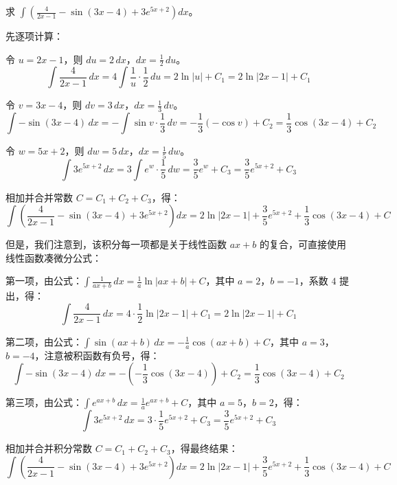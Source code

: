 \begin{myexample}
  求 $\int ( \frac{4}{2x-1} - \sin(3x-4) + 3e^{5x+2} ) dx$。

  先逐项计算：

令 $u = 2x-1$，则 $du = 2\,dx$，$dx = \frac{1}{2}\,du$。
    \[
    \int \frac{4}{2x-1}\,dx = 4\int \frac{1}{u}\cdot\frac{1}{2}\,du
    = 2\ln|u| + C_1 = 2\ln|2x-1| + C_1
    \]

令 $v = 3x-4$，则 $dv = 3\,dx$，$dx = \frac{1}{3}\,dv$。
    \[
    \int -\sin(3x-4)\,dx = -\int \sin v \cdot \frac{1}{3}\,dv
    = -\frac{1}{3}(-\cos v) + C_2 = \frac{1}{3}\cos(3x-4) + C_2
    \]

令 $w = 5x+2$，则 $dw = 5\,dx$，$dx = \frac{1}{5}\,dw$。
    \[
    \int 3e^{5x+2}\,dx = 3\int e^{w}\cdot\frac{1}{5}\,dw
    = \frac{3}{5}e^{w} + C_3 = \frac{3}{5}e^{5x+2} + C_3
    \]

  相加并合并常数 $C = C_1 + C_2 + C_3$，得：
  \[
  \int ( \frac{4}{2x-1} - \sin(3x-4) + 3e^{5x+2} ) dx
  = 2\ln|2x-1| + \frac{3}{5}e^{5x+2} + \frac{1}{3}\cos(3x-4) + C
  \]

  但是，我们注意到，该积分每一项都是关于线性函数 $ax+b$ 的复合，可直接使用线性函数凑微分公式：

第一项，由公式：$\int \frac{1}{ax+b}\,dx = \frac{1}{a}\ln|ax+b|+C$，其中 $a=2$，$b=-1$，系数 $4$ 提出，得：
    \[
    \int \frac{4}{2x-1}\,dx = 4\cdot\frac{1}{2}\ln|2x-1| + C_1 = 2\ln|2x-1| + C_1
    \]

第二项，由公式：$\int \sin(ax+b)\,dx = -\frac{1}{a}\cos(ax+b)+C$，其中 $a=3$，$b=-4$，注意被积函数有负号，得：
    \[
    \int -\sin(3x-4)\,dx = -(-\frac{1}{3}\cos(3x-4)) + C_2 = \frac{1}{3}\cos(3x-4) + C_2
    \]

第三项，由公式：$\int e^{ax+b}\,dx = \frac{1}{a}e^{ax+b}+C$，其中 $a=5$，$b=2$，得：
    \[
    \int 3e^{5x+2}\,dx = 3\cdot\frac{1}{5}e^{5x+2} + C_3 = \frac{3}{5}e^{5x+2} + C_3
    \]

  相加并合并积分常数 $C = C_1 + C_2 + C_3$，得最终结果：
  \[
  \int ( \frac{4}{2x-1} - \sin(3x-4) + 3e^{5x+2} ) dx
  = 2\ln|2x-1| + \frac{3}{5}e^{5x+2} + \frac{1}{3}\cos(3x-4) + C
  \]
\end{myexample}


